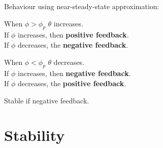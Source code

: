 \documentclass[10pt, compress]{beamer}
\begin{document}
\begin{frame}{Behaviour using near-steady-state approximation:}
    \begin{block}{When $\phi > \phi_p$}
        $\theta$ \alert<2>{increases}. \\
        If $\dot\phi$ increases, then \textbf{positive feedback}. \\
        If $\dot\phi$ \alert<2>{decreases}, the \textbf{negative feedback}.
    \end{block}
    \begin{block}{When $\phi < \phi_p$}
        $\theta$ \alert<2>{decreases}. \\
        If $\dot\phi$ \alert<2>{increases}, then \textbf{negative feedback}. \\
        If $\dot\phi$ decreases, the \textbf{positive feedback}.
    \end{block}
    Stable if \alert<2>{negative feedback}.
\end{frame}

\section{Stability}
\end{document}
